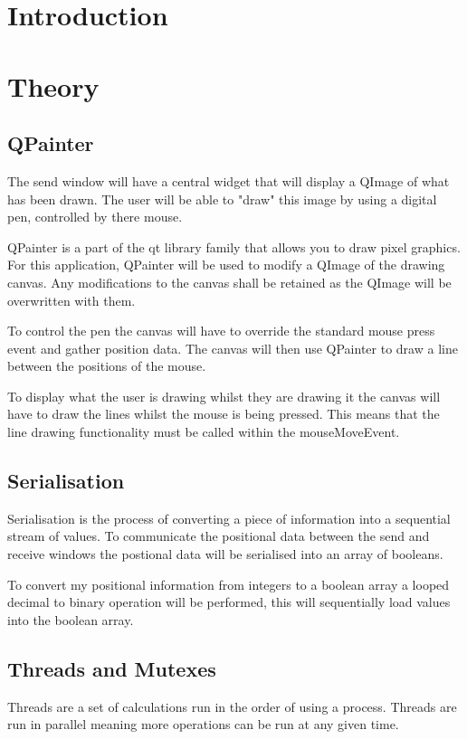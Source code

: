 \documentclass[10pt]{article}
\begin{document}
\begin{multicols*}{2}

\section{Introduction}

\section{Theory}
\subsection{QPainter}
The send window will have a central widget that will display a QImage of what has been drawn. The user will be able to "draw" this image by using a digital pen, controlled by there mouse.

QPainter is a part of the qt library family that allows you to draw pixel graphics. For this application, QPainter will be used to modify a QImage of the drawing canvas. Any modifications to the canvas shall be retained as the QImage will be overwritten with them.

To control the pen the canvas will have to override the standard mouse press event and gather position data. The canvas will then use QPainter to draw a line between the positions of the mouse. 

To display what the user is drawing whilst they are drawing it the canvas will have to draw the lines whilst the mouse is being pressed. This means that the line drawing functionality must be called within the mouseMoveEvent.

\subsection{Serialisation}
Serialisation is the process of converting a piece of information into a sequential stream of values. To communicate the positional data between the send and receive windows the postional data will be serialised into an array of booleans.

To convert my positional information from integers to a boolean array a looped decimal to binary operation will be performed, this will sequentially load values into the boolean array.

\subsection{Threads and Mutexes}
Threads are a set of calculations run in the order of using a process. Threads are run in parallel meaning more operations can be run at any given time.


\end{multicols*}
\end{document}
